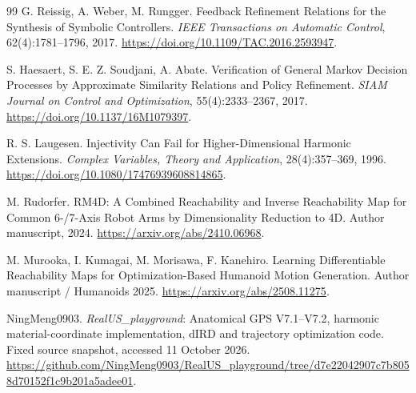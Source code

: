 \documentclass[UTF8,fontset=fandol,zihao=5,a4paper]{ctexart}
\theoremstyle{definition}
\theoremstyle{remark}\newtheorem{remark}[theorem]{说明}
\numberwithin{equation}{section}
\begin{document}
\begin{thebibliography}{99}
 G. Reissig, A. Weber, M. Rungger.
Feedback Refinement Relations for the Synthesis of Symbolic Controllers.
\emph{IEEE Transactions on Automatic Control}, 62(4):1781--1796, 2017.
\url{https://doi.org/10.1109/TAC.2016.2593947}.

 S. Haesaert, S. E. Z. Soudjani, A. Abate.
Verification of General Markov Decision Processes by Approximate Similarity Relations and Policy Refinement.
\emph{SIAM Journal on Control and Optimization}, 55(4):2333--2367, 2017.
\url{https://doi.org/10.1137/16M1079397}.

 R. S. Laugesen.
Injectivity Can Fail for Higher-Dimensional Harmonic Extensions.
\emph{Complex Variables, Theory and Application}, 28(4):357--369, 1996.
\url{https://doi.org/10.1080/17476939608814865}.

 M. Rudorfer.
RM4D: A Combined Reachability and Inverse Reachability Map for Common 6-/7-Axis Robot Arms by Dimensionality Reduction to 4D.
Author manuscript, 2024.
\url{https://arxiv.org/abs/2410.06968}.

 M. Murooka, I. Kumagai, M. Morisawa, F. Kanehiro.
Learning Differentiable Reachability Maps for Optimization-Based Humanoid Motion Generation.
Author manuscript / Humanoids 2025.
\url{https://arxiv.org/abs/2508.11275}.

 NingMeng0903.
\emph{RealUS\_playground}: Anatomical GPS V7.1--V7.2, harmonic material-coordinate implementation, dIRD and trajectory optimization code.
Fixed source snapshot, accessed 11 October 2026.
\url{https://github.com/NingMeng0903/RealUS_playground/tree/d7e22042907c7b8058d70152f1c9b201a5adee01}.
\end{thebibliography}
\end{document}
